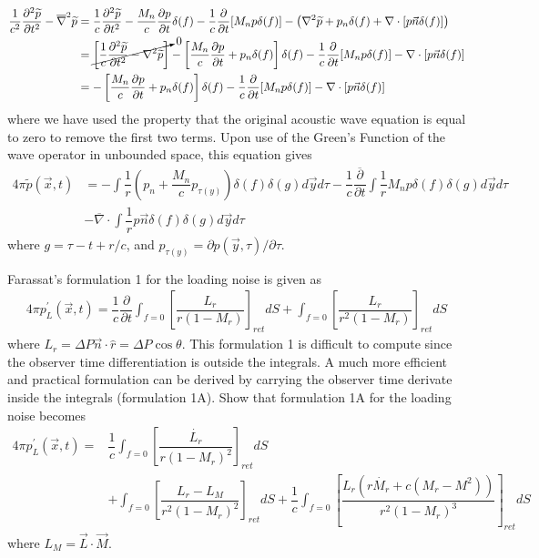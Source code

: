 \documentclass[onecolumn,10pt]{jhwhw}
\begin{document}
\begin{align*}
\dfrac{1}{c^2} \dfrac{\partial^2 \widetilde{p}}{\partial t^2}
- \overline{\nabla}^2 \widetilde{p}
&=
\dfrac{1}{c} \dfrac{\partial^2 \widetilde{p}}{\partial t^2}
- \dfrac{M_n}{c} \dfrac{\partial p}{\partial t} \delta (f)
-\dfrac{1}{c} \dfrac{\partial}{\partial t} [M_n p \delta (f)]
- \left( \nabla^2 \widetilde{p} + p_n \delta (f)
+ \nabla \cdot [p \vec{n} \delta (f)] \right) \\
&=
\cancelto{0}{
\left [\dfrac{1}{c} \dfrac{\partial^2 \widetilde{p}}{\partial t^2}  - \nabla^2 \widetilde{p} \right]}
- \left[ \dfrac{M_n}{c} \dfrac{\partial p}{\partial t} + p_n \delta (f)\right] \delta (f)
-\dfrac{1}{c} \dfrac{\partial}{\partial t} [M_n p \delta (f)]
- \nabla \cdot [p \vec{n} \delta (f)] \\
&=
- \left[ \dfrac{M_n}{c} \dfrac{\partial p}{\partial t} + p_n \delta (f)\right] \delta (f)
-\dfrac{1}{c} \dfrac{\partial}{\partial t} [M_n p \delta (f)]
- \nabla \cdot [p \vec{n} \delta (f)]
\end{align*}
where we have used the property that the original acoustic wave equation is equal to zero to remove the first two terms. Upon use of the Green's Function of the wave operator in unbounded space, this equation gives
\begin{align*}
4 \pi \widetilde{p}(\vec{x}, t) &=
- \int \dfrac{1}{r} \left( p_n + \dfrac{M_n}{c} p_{\tau(y)} \right) \delta (f) \delta(g) d \vec{y} d \tau
- \dfrac{1}{c} \dfrac{\overline{\partial}}{\partial t} \int \dfrac{1}{r} M_n p \delta (f) \delta(g) d \vec{y} d \tau \\
&- \overline{\nabla} \cdot \int \dfrac{1}{r} p \vec{n} \delta (f) \delta (g) d \vec{y} d \tau
\end{align*}
where $g=\tau - t + r/c$, and $p_{\tau (y)} = \partial p (\vec{y}, \tau) / \partial \tau$.

\problem{[50 points]}
Farassat’s formulation 1 for the loading noise is given as
\begin{align} \label{loading_noise}
4 \pi p_L^{\prime}(\vec{x}, t) = \dfrac{1}{c} \dfrac{\partial}{\partial t}
\int_{f=0} \left[ \dfrac{L_r}{r(1-M_r)} \right]_{ret} dS + \int_{f=0} \left[ \dfrac{L_r}{r^2(1-M_r)} \right]_{ret} dS
\end{align}
where $L_r = \Delta P \vec{n} \cdot \hat{r} = \Delta P \cos \theta$. This formulation 1 is difficult to compute since the observer time differentiation is outside the integrals. A much more efficient and practical formulation can be derived by carrying the observer time derivate inside the integrals (formulation 1A). Show that formulation 1A for the loading noise becomes
\begin{align*}
4 \pi p_L^{\prime}(\vec{x}, t) =& \dfrac{1}{c} \int_{f=0} \left[ \dfrac{\dot{L_r}}{r(1-M_r)^2} \right]_{ret} dS \\
&+ \int_{f=0} \left[ \dfrac{L_r-L_M}{r^2(1-M_r)^2} \right]_{ret} dS
+ \dfrac{1}{c} \int_{f=0} \left[ \dfrac{L_r (r \dot{M_r} + c(M_r-M^2))}{r^2(1-M_r)^3} \right]_{ret} dS
\end{align*}
where $L_M = \vec{L} \cdot \vec{M}$.
\end{document}

